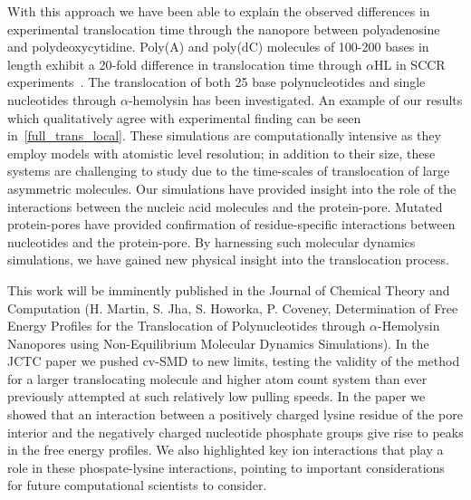 \documentclass[a4paper,10pt]{article}
\newcommand{\ahl}{$\alpha$HL }
\begin{document}
With this approach we have been able to explain the observed
differences in experimental translocation time through the nanopore
between polyadenosine and polydeoxycytidine. Poly(A) and poly(dC)
molecules of 100-200 bases in length exhibit a 20-fold difference in
translocation time through \ahl in SCCR
experiments~\cite{akeson1999mts}. The translocation of both 25 base
polynucleotides and single nucleotides through $\alpha$-hemolysin has
been investigated. An example of our results which qualitatively agree
with experimental finding can be seen in~\ref{full_trans_local}. These
simulations are computationally intensive as they employ models with
atomistic level resolution; in addition to their size, these systems
are challenging to study due to the time-scales of translocation of
large asymmetric molecules. Our simulations have provided insight into
the role of the interactions between the nucleic acid molecules and
the protein-pore. Mutated protein-pores have provided confirmation of
residue-specific interactions between nucleotides and the
protein-pore. By harnessing such molecular dynamics simulations, we
have gained new physical insight into the translocation process. 

This work will be imminently published in the Journal of Chemical
Theory and Computation (H. Martin, S. Jha, S. Howorka, P. Coveney,
Determination of Free Energy Profiles for the Translocation of
Polynucleotides through $\alpha$-Hemolysin Nanopores using
Non-Equilibrium Molecular Dynamics Simulations). In the JCTC paper we
pushed cv-SMD to new limits, testing the validity of the method for a
larger translocating molecule and higher atom count system than ever
previously attempted at such relatively low pulling speeds. In the
paper we showed that an interaction between a positively charged
lysine residue of the pore interior and the negatively charged
nucleotide phosphate groups give rise to peaks in the free energy
profiles. We also highlighted key ion interactions that play a role in
these phospate-lysine interactions, pointing to important
considerations for future computational scientists to consider.
\end{document}
